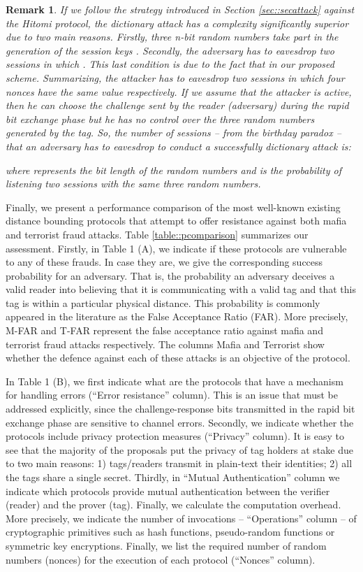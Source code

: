 \documentclass{article}
\newtheorem{remark}{Remark}
\begin{document}
\begin{remark}
If we follow the strategy introduced in Section \ref{sec::secattack} against the Hitomi protocol, the dictionary attack has a complexity significantly superior due to two main reasons. Firstly, three n-bit random numbers  take part in the generation of the session keys . Secondly, the adversary has to eavesdrop two sessions in which  .  This last condition is due to the fact that  in our proposed scheme. Summarizing, the attacker has to eavesdrop two sessions in which four nonces have the same value respectively. If we assume that the attacker is active, then he can choose the challenge sent by the reader (adversary) during the rapid bit exchange phase  but he has no control over the three random numbers generated by the tag. So, the number of sessions  -- from the birthday paradox -- that an adversary has to eavesdrop to conduct a successfully dictionary attack is:


where  represents the bit length of the random numbers and  is the probability of listening two sessions with the same three random numbers.

\end{remark}

Finally, we present a performance comparison of the most well-known existing distance bounding protocols that attempt to offer resistance against both mafia and terrorist fraud attacks.  Table \ref{table::pcomparison} summarizes our assessment. Firstly, in Table 1 (A), we indicate if these protocols are vulnerable to any of these frauds. In case they are, we give the corresponding success probability for an adversary. That is, the probability an adversary deceives a valid reader into believing that it is communicating with a valid tag and that this tag is within a particular physical distance.  This probability is commonly appeared in the literature as the False Acceptance Ratio (FAR). More precisely,  M-FAR and T-FAR represent the false acceptance ratio against mafia and terrorist fraud attacks respectively.  The columns Mafia and Terrorist show whether the defence against each of these attacks is an objective of the protocol.

In Table 1 (B), we first indicate what are the protocols that have a mechanism for handling errors (``Error resistance'' column). This is an issue that must be addressed explicitly, since the challenge-response bits transmitted in the rapid bit exchange phase are sensitive to channel errors. Secondly, we indicate whether the protocols include privacy protection measures (``Privacy'' column). It is easy to see that the majority of the proposals put the privacy of tag holders at stake due to two main reasons: 1) tags/readers transmit in plain-text their identities; 2)  all the tags share a single secret. Thirdly, in ``Mutual Authentication'' column we indicate which protocols provide mutual authentication between the verifier (reader) and the prover (tag). Finally, we calculate the computation overhead. More precisely, we indicate the number of invocations -- ``Operations'' column -- of cryptographic primitives such as hash functions, pseudo-random functions or symmetric key encryptions. Finally, we list the required number of random numbers (nonces) for the execution of each protocol (``Nonces'' column).
\end{document}
